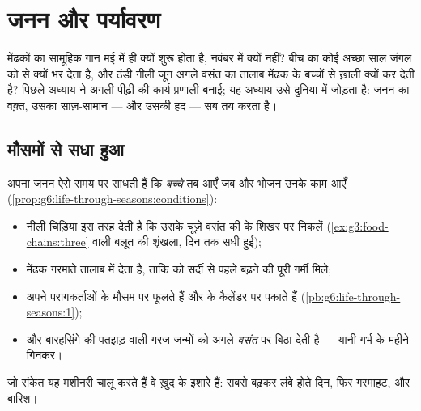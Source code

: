 \chapter{जनन और पर्यावरण}\label{ch:g8:reproduction-and-environment}

मेंढकों का सामूहिक गान मई में ही क्यों शुरू होता है, नवंबर में क्यों
नहीं? बीच का कोई अच्छा साल जंगल को  से क्यों भर देता है, और ठंडी
गीली जून अगले वसंत का तालाब मेंढक के बच्चों से ख़ाली क्यों कर देती है?
पिछले अध्याय ने अगली पीढ़ी की कार्य-प्रणाली बनाई; यह अध्याय उसे दुनिया
में जोड़ता है: जनन का वक़्त, उसका साज़-सामान --- और उसकी हद --- सब
 तय करता है।

\section{मौसमों से सधा हुआ}

\begin{proposition}\label{prop:g8:reproduction-and-environment:timing}
 अपना जनन ऐसे समय पर साधती हैं कि \emph{बच्चे} तब आएँ जब
 और भोजन उनके काम आएँ
(\cref{prop:g6:life-through-seasons:conditions}):
\begin{itemize}
  \item नीली चिड़िया  इस तरह देती है कि उसके चूज़े वसंत की 
        के शिखर पर निकलें (\cref{ex:g3:food-chains:three} वाली बलूत की
        शृंखला, दिन तक सधी हुई);
  \item मेंढक गरमाते तालाब में  देता है, ताकि  को सर्दी से
        पहले बढ़ने की पूरी गर्मी मिले;
  \item {} अपने परागकर्ताओं के मौसम पर फूलते हैं और   के
        कैलेंडर पर पकाते हैं (\cref{pb:g6:life-through-seasons:1});
  \item और बारहसिंगे की पतझड़ वाली गरज जन्मों को अगले \emph{वसंत} पर
        बिठा देती है --- यानी गर्भ के महीने गिनकर।
\end{itemize}
जो संकेत यह मशीनरी चालू करते हैं वे ख़ुद  के इशारे हैं: सबसे
बढ़कर लंबे होते दिन, फिर गरमाहट, और बारिश।
\end{proposition}
\admitted

